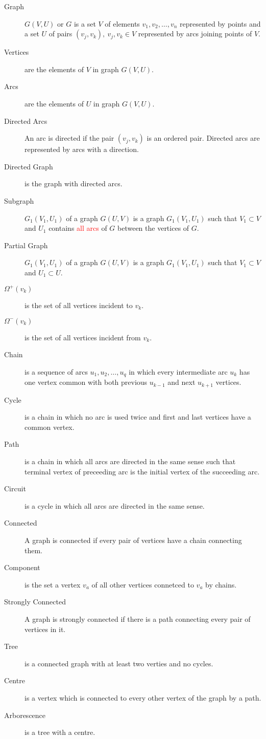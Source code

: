 \begin{description}
	\item[Graph] $G(V,U)$ or $G$ is a set $V$ of elements $v_1,v_2,\dots,v_n$ represented by points and a set $U$ of pairs $(v_j,v_k),\ v_j,v_k \in V$ represented by arcs joining points of $V$.
	\item[Vertices] are the elements of $V$ in graph $G(V,U)$.
	\item[Arcs] are the elements of $U$ in graph $G(V,U)$.
	\item[Directed Arcs] An arc is directed if the pair $(v_j,v_k)$ is an ordered pair. Directed arcs are represented by arcs with a direction. 
	\item[Directed Graph] is the graph with directed arcs.
	\item[Subgraph] $G_1(V_1,U_1)$ of a graph $G(U,V)$ is a graph $G_1(V_1,U_1)$ such that $V_1 \subset V$ and $U_1$ contains \textcolor{red}{all arcs} of $G$ between the vertices of $G$.
	\item[Partial Graph] $G_1(V_1,U_1)$ of a graph $G(U,V)$ is a graph $G_1(V_1,U_1)$ such that $V_1 \subset V$ and $U_1 \subset U$.
	\item[$\Omega^+(v_k)$] is the set of all vertices incident to $v_k$.
	\item[$\Omega^-(v_k)$] is the set of all vertices incident from $v_k$.
	\item[Chain] is a sequence of arcs $u_1,u_2,\dots,u_q$ in which every intermediate arc $u_k$ has one vertex common with both previous $u_{k-1}$ and next $u_{k+1}$ vertices.
	\item[Cycle] is a chain in which no arc is used twice and first and last vertices have a common vertex.
	\item[Path] is a chain in which all arcs are directed in the same sense such that terminal vertex of preceeding arc is the initial vertex of the succeeding arc.
	\item[Circuit] is a cycle in which all arcs are directed in the same sense. 
	\item[Connected] A graph is connected if every pair of vertices have a chain connecting them. 
	\item[Component] is the set a vertex $v_a$ of all other vertices connetced to $v_a$ by chains.
	\item[Strongly Connected] A graph is strongly connected if there is a path connecting every pair of vertices in it.
	\item[Tree] is a connected graph with at least two verties and no cycles.
	\item[Centre] is a vertex which is connected to every other vertex of the graph by a path.
	\item[Arborescence] is a tree with a centre.
\end{description}


